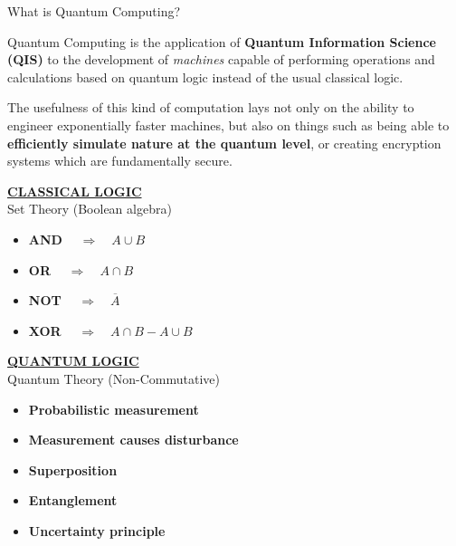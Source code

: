 \documentclass[9pt, handout, aspectratio=169]{beamer}		%
\begin{document}
	\begin{frame}{What is Quantum Computing?}

		Quantum Computing is the application of \textbf{Quantum Information Science (QIS)} to the development of \textit{machines} capable of performing operations and calculations based on quantum logic instead of the usual classical logic.

		\medskip

		The usefulness of this kind of computation lays not only on the ability to engineer exponentially faster machines, but also on things such as being able to \textbf{efficiently simulate nature at the quantum level}, or creating encryption systems which are fundamentally secure.

		\medskip

		\begin{multicols}{2}

			\underline{\textbf{CLASSICAL LOGIC}}\\
			Set Theory (Boolean algebra)

			\medskip

			\begin{itemize}
				\item \textbf{AND} $\quad \Rightarrow \quad A \cup B$
				\item \textbf{OR} $\quad \Rightarrow \quad A \cap B$
				\item \textbf{NOT} $\quad \Rightarrow \quad \overline{A}$
				\item \textbf{XOR} $ \quad \Rightarrow \quad A \cap B - A \cup B$
			\end{itemize}

			\columnbreak

			\underline{\textbf{	QUANTUM LOGIC}}\\
			Quantum Theory (Non-Commutative)

			\medskip

			\begin{itemize}
				\item \textbf{Probabilistic measurement}
				\item \textbf{Measurement causes disturbance}
				\item \textbf{Superposition}
				\item \textbf{Entanglement}
				\item \textbf{Uncertainty principle}
			\end{itemize}

		\end{multicols}

	\end{frame}
\end{document}
